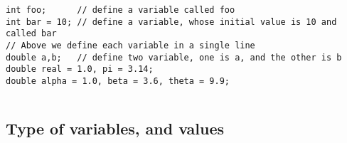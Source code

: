 \documentclass[en, 11pt, xcolor=dvipsnames]{beamer}
\begin{document}
\begin{frame}[fragile]
\begin{columns}[c]
\begin{column}{0.9\textwidth}
			\begin{lstlisting}[style=Java]
int foo;      // define a variable called foo
int bar = 10; // define a variable, whose initial value is 10 and called bar
// Above we define each variable in a single line
double a,b;   // define two variable, one is a, and the other is b
double real = 1.0, pi = 3.14;
double alpha = 1.0, beta = 3.6, theta = 9.9;\end{lstlisting}

		\end{column}
	\end{columns}

\end{frame}


\subsection{Type of variables, and values}
\end{document}

